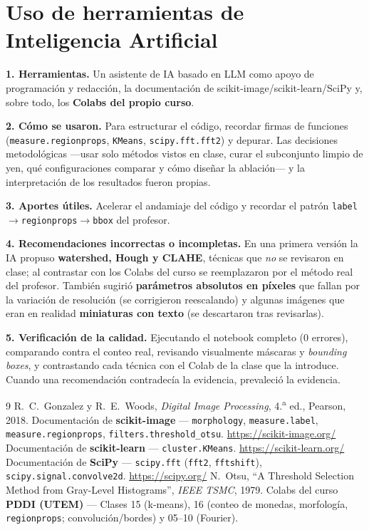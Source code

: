 \documentclass[11pt,a4paper]{article}
\newcommand{\code}[1]{\texttt{#1}}
\begin{document}
\section*{Uso de herramientas de Inteligencia Artificial}

\textbf{1. Herramientas.} Un asistente de IA basado en LLM como apoyo de programación y redacción, la
documentación de scikit-image/scikit-learn/SciPy y, sobre todo, los \textbf{Colabs del propio curso}.

\textbf{2. Cómo se usaron.} Para estructurar el código, recordar firmas de funciones
(\code{measure.regionprops}, \code{KMeans}, \code{scipy.fft.fft2}) y depurar. Las decisiones metodológicas
---usar solo métodos vistos en clase, curar el subconjunto limpio de yen, qué configuraciones comparar y
cómo diseñar la ablación--- y la interpretación de los resultados fueron propias.

\textbf{3. Aportes útiles.} Acelerar el andamiaje del código y recordar el patrón
\code{label}$\rightarrow$\code{regionprops}$\rightarrow$\code{bbox} del profesor.

\textbf{4. Recomendaciones incorrectas o incompletas.} En una primera versión la IA propuso
\textbf{watershed, Hough y CLAHE}, técnicas que \emph{no} se revisaron en clase; al contrastar con los
Colabs del curso se reemplazaron por el método real del profesor. También sugirió \textbf{parámetros
absolutos en píxeles} que fallan por la variación de resolución (se corrigieron reescalando) y algunas
imágenes que eran en realidad \textbf{miniaturas con texto} (se descartaron tras revisarlas).

\textbf{5. Verificación de la calidad.} Ejecutando el notebook completo (0 errores), comparando contra el
conteo real, revisando visualmente máscaras y \emph{bounding boxes}, y contrastando cada técnica con el
Colab de la clase que la introduce. Cuando una recomendación contradecía la evidencia, prevaleció la
evidencia.

\begin{thebibliography}{9}
 R.\ C.\ Gonzalez y R.\ E.\ Woods, \emph{Digital Image Processing}, 4.\textsuperscript{a} ed.,
Pearson, 2018.
 Documentación de \textbf{scikit-image} --- \code{morphology}, \code{measure.label},
\code{measure.regionprops}, \code{filters.threshold\_otsu}. \url{https://scikit-image.org/}
 Documentación de \textbf{scikit-learn} --- \code{cluster.KMeans}.
\url{https://scikit-learn.org/}
 Documentación de \textbf{SciPy} --- \code{scipy.fft} (\code{fft2}, \code{fftshift}),
\code{scipy.signal.convolve2d}. \url{https://scipy.org/}
 N.\ Otsu, ``A Threshold Selection Method from Gray-Level Histograms'', \emph{IEEE TSMC},
1979.
 Colabs del curso \textbf{PDDI (UTEM)} --- Clases 15 (k-means), 16 (conteo de monedas,
morfología, \code{regionprops}; convolución/bordes) y 05--10 (Fourier).
\end{thebibliography}
\end{document}
